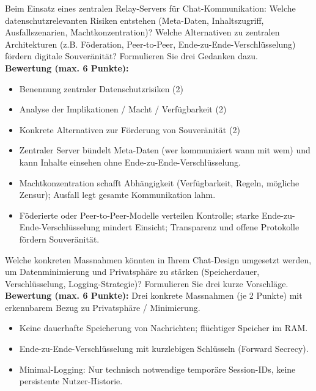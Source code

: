 \begin{myexercise}
Beim Einsatz eines zentralen Relay-Servers für Chat-Kommunikation: Welche datenschutzrelevanten Risiken entstehen (Meta-Daten, Inhaltszugriff, Ausfallszenarien, Machtkonzentration)? Welche Alternativen zu zentralen Architekturen (z.B. Föderation, Peer-to-Peer, Ende-zu-Ende-Verschlüsselung) fördern digitale Souveränität? Formulieren Sie drei Gedanken dazu.
    \\[.5cm]
    \textbf{Bewertung (max. 6 Punkte):}
    \begin{itemize}
        \item Benennung zentraler Datenschutzrisiken (2)
        \item Analyse der Implikationen / Macht / Verfügbarkeit (2)
        \item Konkrete Alternativen zur Förderung von Souveränität (2)
    \end{itemize}
\begin{myanswer}
\begin{itemize}
    \item Zentraler Server bündelt Meta-Daten (wer kommuniziert wann mit wem) und kann Inhalte einsehen ohne Ende-zu-Ende-Verschlüsselung.
    \item Machtkonzentration schafft Abhängigkeit (Verfügbarkeit, Regeln, mögliche Zensur); Ausfall legt gesamte Kommunikation lahm.
    \item Föderierte oder Peer-to-Peer-Modelle verteilen Kontrolle; starke Ende-zu-Ende-Verschlüsselung mindert Einsicht; Transparenz und offene Protokolle fördern Souveränität.
\end{itemize}
\end{myanswer}
\end{myexercise}

\begin{myexercise}
Welche konkreten Massnahmen könnten in Ihrem Chat-Design umgesetzt werden, um Datenminimierung und Privatsphäre zu stärken (Speicherdauer, Verschlüsselung, Logging-Strategie)? Formulieren Sie drei kurze Vorschläge.
    \\[.5cm]
    \textbf{Bewertung (max. 6 Punkte):} Drei konkrete Massnahmen (je 2 Punkte) mit erkennbarem Bezug zu Privatsphäre / Minimierung.
\begin{myanswer}
\begin{itemize}
    \item Keine dauerhafte Speicherung von Nachrichten; flüchtiger Speicher im RAM.
    \item Ende-zu-Ende-Verschlüsselung mit kurzlebigen Schlüsseln (Forward Secrecy).
    \item Minimal-Logging: Nur technisch notwendige temporäre Session-IDs, keine persistente Nutzer-Historie.
\end{itemize}
\end{myanswer}
\end{myexercise}

